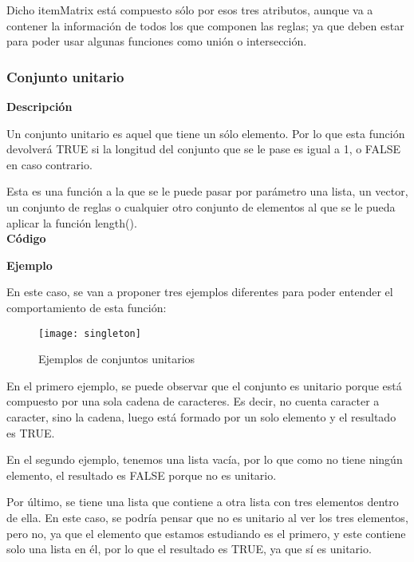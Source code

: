     Dicho itemMatrix est\'a compuesto s\'olo por esos tres atributos, aunque va a contener la informaci\'on de todos los que 
    componen las reglas; ya que deben estar para poder usar algunas funciones como uni\'on o intersecci\'on.



\subsubsection{Conjunto unitario}

    \textbf{Descripci\'on}
    
    Un conjunto unitario es aquel que tiene un s\'olo elemento. Por lo que esta funci\'on 
    devolver\'a TRUE si la longitud del conjunto que se le pase es igual a 1, o FALSE en caso 
    contrario.

    Esta es una funci\'on a la que se le puede pasar por par\'ametro una lista, un vector, 
    un conjunto de reglas o cualquier otro conjunto de elementos al que se le pueda aplicar la funci\'on 
    length().
    \\


    \textbf{C\'odigo}

    

    
    \textbf{Ejemplo}

    En este caso, se van a proponer tres ejemplos diferentes para poder entender el comportamiento de esta funci\'on:

    \begin{figure}[H]
        \centering
        \texttt{[image: singleton]}
        \caption{Ejemplos de conjuntos unitarios}
        \label{fig:singleton}
    \end{figure}

    En el primero ejemplo, se puede observar que el conjunto es unitario porque est\'a compuesto por una sola cadena de caracteres. 
    Es decir, no cuenta caracter a caracter, sino la cadena, luego est\'a formado por un solo elemento y el resultado es TRUE.

    En el segundo ejemplo, tenemos una lista vac\'ia, por lo que como no tiene ning\'un elemento, el resultado es FALSE porque no es unitario.

    Por \'ultimo, se tiene una lista que contiene a otra lista con tres elementos dentro de ella. En este caso, se podr\'ia pensar que 
    no es unitario al ver los tres elementos, pero no, ya que el elemento que estamos estudiando es el primero, y este contiene solo una lista 
    en \'el, por lo que el resultado es TRUE, ya que s\'i es unitario.




